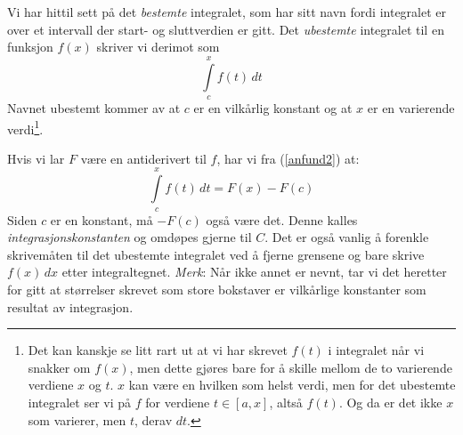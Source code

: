 \anfndto
\anfndtoe
{}
Vi har hittil sett på det \textit{bestemte} integralet, som har sitt navn fordi integralet er over et intervall der start- og sluttverdien er gitt. Det \textit{ubestemte} integralet til en funksjon $ f(x) $ skriver vi derimot som
\[ \int\limits_c^x f(t)\, dt \]
Navnet ubestemt kommer av at $ c $ er en vilkårlig konstant og at $ x $ er en varierende verdi\footnote{Det kan kanskje se litt rart ut at vi har skrevet $ f(t) $ i integralet når vi snakker om $ f(x) $, men dette gjøres bare for å skille mellom de to varierende verdiene $ x $ og $ t $. $ x $ kan være en hvilken som helst verdi, men for det ubestemte integralet ser vi på $ f $ for verdiene $ {t\in [a, x]} $, altså $ f(t) $. Og da er det ikke $ x $ som varierer, men $ t $, derav $ dt $.}.\vsk

Hvis vi lar $ F$ være en antiderivert til $ f $, har vi fra (\ref{anfund2}) at:
\[ \int\limits_c^x f(t)\, dt = F(x)-F(c)  \]
Siden $ c $ er en konstant, må $ -F(c) $ også være det. Denne kalles \textit{integrasjonskonstanten} og omdøpes gjerne til $ C $. Det er også vanlig å forenkle skrivemåten til det ubestemte integralet ved å fjerne grensene og bare skrive $ f(x)\,dx $ etter integraltegnet.\regv
\uint\regv
\textsl{Merk}: Når ikke annet er nevnt, tar vi det heretter for gitt at størrelser skrevet som store bokstaver er vilkårlige konstanter som resultat av integrasjon.\regv
\uinte
\newpage
\uinteto


\begin{comment}
	\tssec{Analysens fundamentalteorem I}	
	Når vi har etablert konseptet bak det ubestemte integralet, er veien kort til den andre delen av analysens fundamentalteorem. Vi deriverer da på begge sider av (\ref{uint}):
	\[ \left(\int f(x)\, dx\right)'  = \left(F(x)+ C\right)' \]
	Vi vet at $ F'(x)=f(x) $, og videre er $ C'=0 $, derfor får vi:
	\anfnden
	\anfndene
\end{comment}
